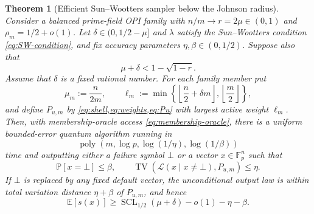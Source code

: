 \documentclass[11pt,letterpaper]{article}
\newtheorem{theorem}{Theorem}[section]
\theoremstyle{definition}
\newcommand{\F}{\mathbb{F}}
\newcommand{\poly}{\operatorname{poly}}
\newcommand{\SCL}{\operatorname{SCL}}
\newcommand{\TV}{\operatorname{TV}}
\newcommand{\E}{\mathbb{E}}
\newcommand{\Prb}{\mathbb{P}}
\begin{document}
\begin{theorem}[Efficient Sun--Wootters sampler below the Johnson radius]
\label{thm:main-sampler}
Consider a balanced prime-field OPI family with $n/m\to r=2\mu\in(0,1)$ and $\rho_m=1/2+o(1)$.  Let $\delta\in(0,1/2-\mu]$ and $\lambda$ satisfy the Sun--Wootters condition \cref{eq:SW-condition}, and fix accuracy parameters $\eta,\beta\in(0,1/2)$.  Suppose also that
\begin{equation}
   \mu+\delta<1-\sqrt{1-r}.
   \label{eq:asymptotic-Johnson}
\end{equation}
Assume that $\delta$ is a fixed rational number.  For each family member put
\begin{equation}
   \mu_m:=\frac{n}{2m},
   \qquad
   \ell_m:=\min\left\{
      \left\lfloor\frac n2+\delta m\right\rfloor,
      \left\lfloor\frac m2\right\rfloor
   \right\},
   \label{eq:computable-shell-family}
\end{equation}
and define $P_{u,m}$ by \cref{eq:shell,eq:weights,eq:Pu} with largest active weight $\ell_m$.  Then, with membership-oracle access \cref{eq:membership-oracle}, there is a uniform bounded-error quantum algorithm running in
\begin{equation}
   \poly(m,\log p,\log(1/\eta),\log(1/\beta))
\end{equation}
time and outputting either a failure symbol $\bot$ or a vector $x\in\F_p^n$ such that
\begin{equation}
   \Prb[x=\bot]\le\beta,
   \qquad
   \TV\!\left(\mathcal L(x\mid x\ne\bot),P_{u,m}\right)\le\eta.
   \label{eq:sampler-failure-semantics}
\end{equation}
If $\bot$ is replaced by any fixed default vector, the unconditional output law is within total variation distance $\eta+\beta$ of $P_{u,m}$, and hence
\begin{equation}
   \E[s(x)]\ge\SCL_{1/2}(\mu+\delta)-o(1)-\eta-\beta.
   \label{eq:algorithm-score}
\end{equation}
\end{theorem}
\end{document}

